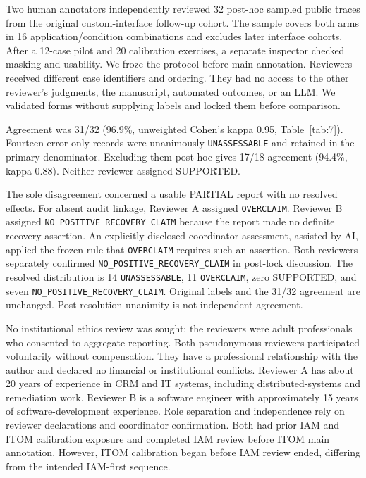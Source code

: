\documentclass[conference,10pt]{IEEEtran}
\begin{document}
Two human annotators independently reviewed 32 post\hyp{}hoc sampled public traces from the original custom\hyp{}interface follow\hyp{}up cohort. The sample covers both arms in 16 application/condition combinations and excludes later interface cohorts. After a 12-case pilot and 20 calibration exercises, a separate inspector checked masking and usability. We froze the protocol before main annotation. Reviewers received different case identifiers and ordering. They had no access to the other reviewer's judgments, the manuscript, automated outcomes, or an LLM. We validated forms without supplying labels and locked them before comparison.

Agreement was 31/32 (96.9\%, unweighted Cohen's kappa 0.95, Table~\ref{tab:7}). Fourteen error\hyp{}only records were unanimously \texttt{\mbox{UNASSESSABLE}} and retained in the primary denominator. Excluding them post hoc gives 17/18 agreement (94.4\%, kappa 0.88). Neither reviewer assigned SUPPORTED.

The sole disagreement concerned a usable PARTIAL report with no resolved effects. For absent audit linkage, Reviewer A assigned \texttt{\mbox{OVERCLAIM}}. Reviewer B assigned \texttt{\mbox{NO\_}\discretionary{}{}{}\mbox{POSITIVE\_}\discretionary{}{}{}\mbox{RECOVERY\_}\discretionary{}{}{}\mbox{CLAIM}} because the report made no definite recovery assertion. An explicitly disclosed coordinator assessment, assisted by AI, applied the frozen rule that \texttt{\mbox{OVERCLAIM}} requires such an assertion. Both reviewers separately confirmed \texttt{\mbox{NO\_}\discretionary{}{}{}\mbox{POSITIVE\_}\discretionary{}{}{}\mbox{RECOVERY\_}\discretionary{}{}{}\mbox{CLAIM}} in post\hyp{}lock discussion. The resolved distribution is 14 \texttt{\mbox{UNASSESSABLE}}, 11 \texttt{\mbox{OVERCLAIM}}, zero SUPPORTED, and seven \texttt{\mbox{NO\_}\discretionary{}{}{}\mbox{POSITIVE\_}\discretionary{}{}{}\mbox{RECOVERY\_}\discretionary{}{}{}\mbox{CLAIM}}. Original labels and the 31/32 agreement are unchanged. Post\hyp{}resolution unanimity is not independent agreement.

No institutional ethics review was sought; the reviewers were adult professionals who consented to aggregate reporting. Both pseudonymous reviewers participated voluntarily without compensation. They have a professional relationship with the author and declared no financial or institutional conflicts. Reviewer A has about 20 years of experience in CRM and IT systems, including distributed\hyp{}systems and remediation work. Reviewer B is a software engineer with approximately 15 years of software\hyp{}development experience. Role separation and independence rely on reviewer declarations and coordinator confirmation. Both had prior IAM and ITOM calibration exposure and completed IAM review before ITOM main annotation. However, ITOM calibration began before IAM review ended, differing from the intended IAM-first sequence.
\end{document}
